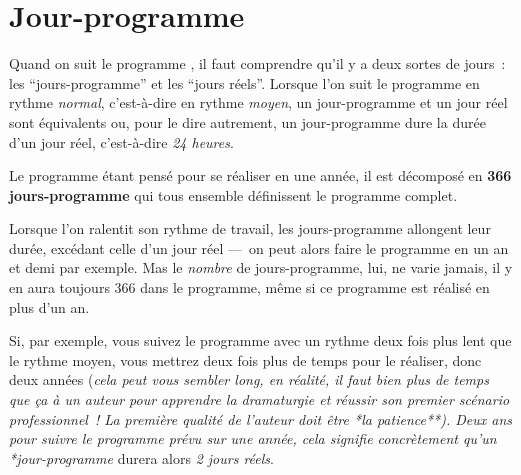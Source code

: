 % 
% 
% 
% 
% 
% 
% 
% 

\section{Jour-programme}\hypertarget{explicationjourprogrammejourreel}{}\label{explicationjourprogrammejourreel}

Quand on suit le programme \unan{}, il faut comprendre qu'il y a deux sortes de jours~{}: les ``jours-programme'' et les ``jours réels''. Lorsque l'on suit le programme en rythme \emph{normal}, c'est-à-dire en rythme \emph{moyen}, un jour-programme et un jour réel sont équivalents ou, pour le dire autrement, un jour-programme dure la durée d'un jour réel, c'est-à-dire \emph{24 heures}.

Le programme \unan{} étant pensé pour se réaliser en une année, il est décomposé en \textbf{366 jours-programme} qui tous ensemble définissent le programme complet.

Lorsque l'on ralentit son rythme de travail, les jours-programme allongent leur durée, excédant celle d'un jour réel —~{}on peut alors faire le programme \unan{} en un an et demi par exemple. Mas le \emph{nombre} de jours-programme, lui, ne varie jamais, il y en aura toujours 366 dans le programme, même si ce programme est réalisé en plus d'un an.

Si, par exemple, vous suivez le programme \unan{} avec un rythme deux fois plus lent que le rythme moyen, vous mettrez deux fois plus de temps pour le réaliser, donc deux années (\emph{cela peut vous sembler long, en réalité, il faut bien plus de temps que ça à un auteur pour apprendre la dramaturgie et réussir son premier scénario professionnel~{}! La première qualité de l'auteur doit être *la patience**). Deux ans pour suivre le programme prévu sur une année, cela signifie concrètement qu'un *jour-programme} durera alors \emph{2 jours réels}.

